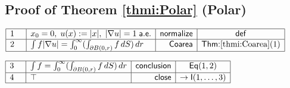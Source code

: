 \documentclass[11pt,reqno]{amsart}
\begin{document}
	\subsection*{Proof of Theorem \protect\ref{thmi:Polar} (\textsf{Polar})}
	\noindent$\begin{array}{|m{0.5cm}|l|r|c|}
	\hline
	1 & x_{0}=0,\;u(x):=|x|,\;|\nabla u|=1\;\mathsf{a.e.} & \mathsf{normalize} & \mathsf{def} \\ \hline
	2 & \int f|\nabla u|=\int_{0}^{\infty}(\int_{\partial B(0,r)}f\,dS)\,dr & \mathsf{Coarea} & \textsf{Thm:}\ref{thmi:Coarea}(1) \\ \hline
	\end{array}$
	\par\nointerlineskip\noindent$\begin{array}{|m{0.5cm}|l|r|c|}
	\hline
	3 & \int f=\int_{0}^{\infty}(\int_{\partial B(0,r)}f\,dS)\,dr & \mathsf{conclusion} & \mathsf{Eq}(1,2) \\ \hline
	4 & \top & \mathsf{close} & \to\mathsf{I}(1,\dots,3) \\ \hline
	\end{array}$
	\medskip
	
\end{document}
